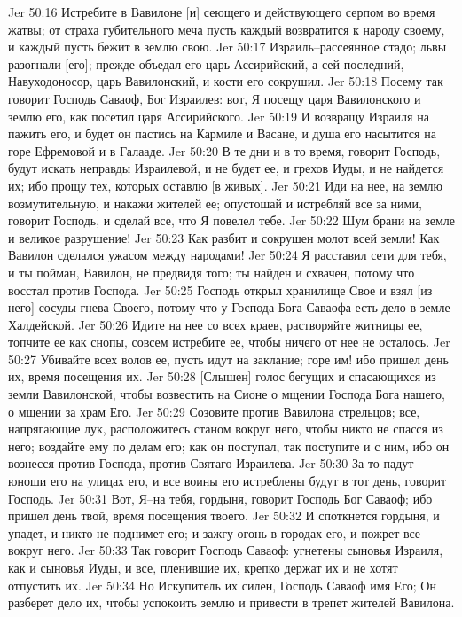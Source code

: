 Jer 50:16  Истребите в Вавилоне [и] сеющего и действующего серпом во время жатвы; от страха губительного меча пусть каждый возвратится к народу своему, и каждый пусть бежит в землю свою.
Jer 50:17  Израиль--рассеянное стадо; львы разогнали [его]; прежде объедал его царь Ассирийский, а сей последний, Навуходоносор, царь Вавилонский, и кости его сокрушил.
Jer 50:18  Посему так говорит Господь Саваоф, Бог Израилев: вот, Я посещу царя Вавилонского и землю его, как посетил царя Ассирийского.
Jer 50:19  И возвращу Израиля на пажить его, и будет он пастись на Кармиле и Васане, и душа его насытится на горе Ефремовой и в Галааде.
Jer 50:20  В те дни и в то время, говорит Господь, будут искать неправды Израилевой, и не будет ее, и грехов Иуды, и не найдется их; ибо прощу тех, которых оставлю [в живых].
Jer 50:21  Иди на нее, на землю возмутительную, и накажи жителей ее; опустошай и истребляй все за ними, говорит Господь, и сделай все, что Я повелел тебе.
Jer 50:22  Шум брани на земле и великое разрушение!
Jer 50:23  Как разбит и сокрушен молот всей земли! Как Вавилон сделался ужасом между народами!
Jer 50:24  Я расставил сети для тебя, и ты пойман, Вавилон, не предвидя того; ты найден и схвачен, потому что восстал против Господа.
Jer 50:25  Господь открыл хранилище Свое и взял [из него] сосуды гнева Своего, потому что у Господа Бога Саваофа есть дело в земле Халдейской.
Jer 50:26  Идите на нее со всех краев, растворяйте житницы ее, топчите ее как снопы, совсем истребите ее, чтобы ничего от нее не осталось.
Jer 50:27  Убивайте всех волов ее, пусть идут на заклание; горе им! ибо пришел день их, время посещения их.
Jer 50:28  [Слышен] голос бегущих и спасающихся из земли Вавилонской, чтобы возвестить на Сионе о мщении Господа Бога нашего, о мщении за храм Его.
Jer 50:29  Созовите против Вавилона стрельцов; все, напрягающие лук, расположитесь станом вокруг него, чтобы никто не спасся из него; воздайте ему по делам его; как он поступал, так поступите и с ним, ибо он вознесся против Господа, против Святаго Израилева.
Jer 50:30  За то падут юноши его на улицах его, и все воины его истреблены будут в тот день, говорит Господь.
Jer 50:31  Вот, Я--на тебя, гордыня, говорит Господь Бог Саваоф; ибо пришел день твой, время посещения твоего.
Jer 50:32  И споткнется гордыня, и упадет, и никто не поднимет его; и зажгу огонь в городах его, и пожрет все вокруг него.
Jer 50:33  Так говорит Господь Саваоф: угнетены сыновья Израиля, как и сыновья Иуды, и все, пленившие их, крепко держат их и не хотят отпустить их.
Jer 50:34  Но Искупитель их силен, Господь Саваоф имя Его; Он разберет дело их, чтобы успокоить землю и привести в трепет жителей Вавилона.
